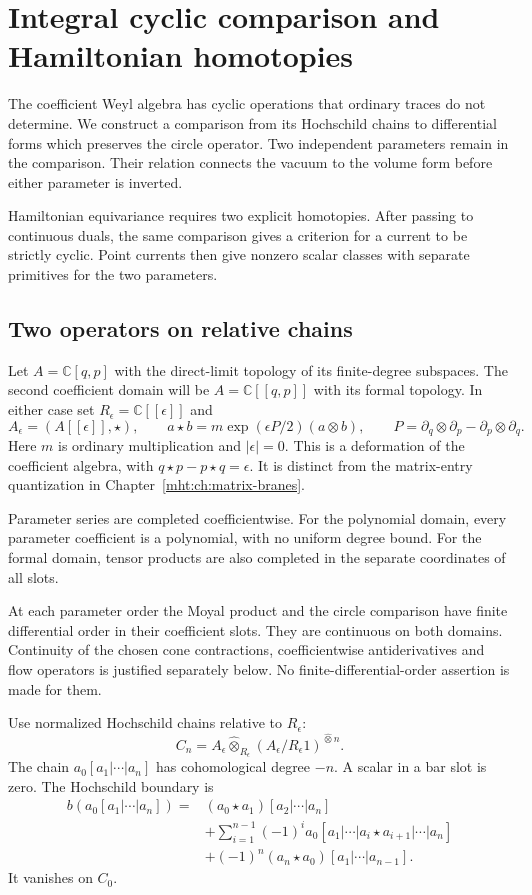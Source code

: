 \chapter{Integral cyclic comparison and Hamiltonian homotopies}
\label{mht:ch:integral-cyclic}

The coefficient Weyl algebra has cyclic operations that ordinary
traces do not determine. We construct a comparison from its
Hochschild chains to differential forms which preserves the circle
operator. Two independent parameters remain in the comparison.
Their relation connects the vacuum to the volume form before
either parameter is inverted.

Hamiltonian equivariance requires two explicit homotopies.
After passing to continuous duals, the same comparison gives a
criterion for a current to be strictly cyclic. Point currents
then give nonzero scalar classes with separate primitives for
the two parameters.

\section{Two operators on relative chains}

Let $A=\mathbb C[q,p]$ with the direct-limit topology of its
finite-degree subspaces. The second coefficient domain will be
$A=\mathbb C[[q,p]]$ with its formal topology. In either case set
$R_\epsilon=\mathbb C[[\epsilon]]$ and
\[
 A_\epsilon=(A[[\epsilon]],\star),\qquad
 a\star b=m\exp(\epsilon P/2)(a\otimes b),\qquad
 P=\partial_q\otimes\partial_p-\partial_p\otimes\partial_q.
\]
Here $m$ is ordinary multiplication and $|\epsilon|=0$.
This is a deformation of the coefficient algebra, with
$q\star p-p\star q=\epsilon$. It is distinct from the matrix-entry
quantization in Chapter~\ref{mht:ch:matrix-branes}.

Parameter series are completed coefficientwise. For the
polynomial domain, every parameter coefficient is a polynomial,
with no uniform degree bound. For the formal domain, tensor
products are also completed in the separate coordinates of
all slots.

At each parameter order the Moyal product and the circle comparison
have finite differential order in their coefficient slots.
They are continuous on both domains.
Continuity of the chosen cone contractions, coefficientwise
antiderivatives and flow operators is justified separately below.
No finite-differential-order assertion is made for them.

Use normalized Hochschild chains relative to $R_\epsilon$:
\[
 C_n=A_\epsilon\widehat\otimes_{R_\epsilon}
          (A_\epsilon/R_\epsilon1)^{\widehat\otimes n}.
\]
The chain $a_0[a_1|\cdots|a_n]$ has cohomological degree $-n$.
A scalar in a bar slot is zero. The Hochschild boundary is
\begin{align*}
 b(a_0[a_1|\cdots|a_n])
 ={}&(a_0\star a_1)[a_2|\cdots|a_n]\\
 &+\sum_{i=1}^{n-1}(-1)^i
       a_0[a_1|\cdots|a_i\star a_{i+1}|\cdots|a_n]\\
 &+(-1)^n(a_n\star a_0)[a_1|\cdots|a_{n-1}].
\end{align*}
It vanishes on $C_0$.

